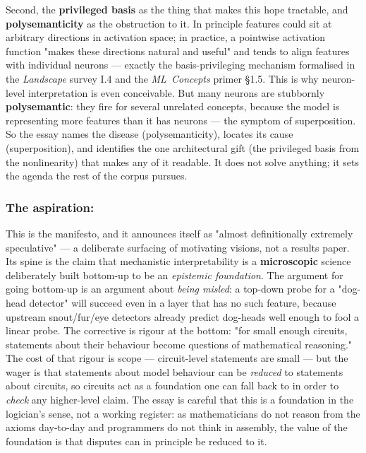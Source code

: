 Second, the \textbf{privileged basis} as the thing that makes this hope tractable, and \textbf{polysemanticity} as the obstruction to it. In principle features could sit at arbitrary directions in activation space; in practice, a pointwise activation function "makes these directions natural and useful" and tends to align features with individual neurons --- exactly the basis-privileging mechanism formalised in the \emph{Landscape} survey I.4 and the \emph{ML~Concepts} primer \S1.5. This is why neuron-level interpretation is even conceivable. But many neurons are stubbornly \textbf{polysemantic}: they fire for several unrelated concepts, because the model is representing more features than it has neurons --- the symptom of superposition. So the essay names the disease (polysemanticity), locates its cause (superposition), and identifies the one architectural gift (the privileged basis from the nonlinearity) that makes any of it readable. It does not solve anything; it sets the agenda the rest of the corpus pursues.


\subsubsection*{The aspiration: \texorpdfstring{\textcite{interpretability-dreams}}{Interpretability Dreams}}

This is the manifesto, and it announces itself as "almost definitionally extremely speculative" --- a deliberate surfacing of motivating visions, not a results paper. Its spine is the claim that mechanistic interpretability is a \textbf{microscopic} science deliberately built bottom-up to be an \emph{epistemic foundation}. The argument for going bottom-up is an argument about \emph{being misled}: a top-down probe for a "dog-head detector" will succeed even in a layer that has no such feature, because upstream snout/fur/eye detectors already predict dog-heads well enough to fool a linear probe. The corrective is rigour at the bottom: "for small enough circuits, statements about their behaviour become questions of mathematical reasoning." The cost of that rigour is scope --- circuit-level statements are small --- but the wager is that statements about model behaviour can be \emph{reduced} to statements about circuits, so circuits act as a foundation one can fall back to in order to \emph{check} any higher-level claim. The essay is careful that this is a foundation in the logician's sense, not a working register: as mathematicians do not reason from the axioms day-to-day and programmers do not think in assembly, the value of the foundation is that disputes can in principle be reduced to it.

